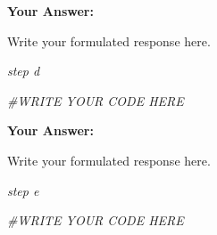 \documentclass[
]{article}
\newenvironment{Shaded}{\begin{snugshade}}{\end{snugshade}}
\newcommand{\CommentTok}[1]{\textcolor[rgb]{0.56,0.35,0.01}{\textit{#1}}}
\begin{document}
\textbf{Your Answer:}

Write your formulated response here.

\emph{step d}

\begin{Shaded}
\begin{Highlighting}[]
\CommentTok{\#WRITE YOUR CODE HERE}
\end{Highlighting}
\end{Shaded}

\textbf{Your Answer:}

Write your formulated response here.

\emph{step e}

\begin{Shaded}
\begin{Highlighting}[]
\CommentTok{\#WRITE YOUR CODE HERE}
\end{Highlighting}
\end{Shaded}
\end{document}
